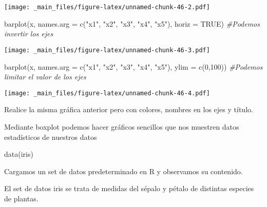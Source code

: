 \documentclass[
]{book}
\newenvironment{Shaded}{\begin{snugshade}}{\end{snugshade}}
\newcommand{\AttributeTok}[1]{\textcolor[rgb]{0.77,0.63,0.00}{#1}}
\newcommand{\CommentTok}[1]{\textcolor[rgb]{0.56,0.35,0.01}{\textit{#1}}}
\newcommand{\ConstantTok}[1]{\textcolor[rgb]{0.00,0.00,0.00}{#1}}
\newcommand{\DecValTok}[1]{\textcolor[rgb]{0.00,0.00,0.81}{#1}}
\newcommand{\FunctionTok}[1]{\textcolor[rgb]{0.00,0.00,0.00}{#1}}
\newcommand{\NormalTok}[1]{#1}
\newcommand{\SpecialCharTok}[1]{\textcolor[rgb]{0.00,0.00,0.00}{#1}}
\newcommand{\StringTok}[1]{\textcolor[rgb]{0.31,0.60,0.02}{#1}}
\begin{document}
\texttt{[image: \_main\_files/figure-latex/unnamed-chunk-46-2.pdf]}

\begin{Shaded}
\begin{Highlighting}[]
\FunctionTok{barplot}\NormalTok{(x, }\AttributeTok{names.arg =} \FunctionTok{c}\NormalTok{(}\StringTok{"x1"}\NormalTok{, }\StringTok{"x2"}\NormalTok{, }\StringTok{"x3"}\NormalTok{, }\StringTok{"x4"}\NormalTok{, }\StringTok{"x5"}\NormalTok{), }\AttributeTok{horiz =} \ConstantTok{TRUE}\NormalTok{) }\CommentTok{\#Podemos invertir los ejes}
\end{Highlighting}
\end{Shaded}

\texttt{[image: \_main\_files/figure-latex/unnamed-chunk-46-3.pdf]}

\begin{Shaded}
\begin{Highlighting}[]
\FunctionTok{barplot}\NormalTok{(x, }\AttributeTok{names.arg =} \FunctionTok{c}\NormalTok{(}\StringTok{"x1"}\NormalTok{, }\StringTok{"x2"}\NormalTok{, }\StringTok{"x3"}\NormalTok{, }\StringTok{"x4"}\NormalTok{, }\StringTok{"x5"}\NormalTok{), }\AttributeTok{ylim =} \FunctionTok{c}\NormalTok{(}\DecValTok{0}\NormalTok{,}\DecValTok{100}\NormalTok{)) }\CommentTok{\#Podemos limitar el valor de los ejes}
\end{Highlighting}
\end{Shaded}

\texttt{[image: \_main\_files/figure-latex/unnamed-chunk-46-4.pdf]}

Realice la misma gráfica anterior pero con colores, nombres en los ejes y título.

Mediante boxplot podemos hacer gráficos sencillos que nos muestren datos estadísticos de nuestros datos

\begin{Shaded}
\begin{Highlighting}[]
\FunctionTok{data}\NormalTok{(iris)}
\end{Highlighting}
\end{Shaded}

Cargamos un set de datos predeterminado en R y observamos su contenido.

El set de datos iris se trata de medidas del sépalo y pétalo de distintas especies de plantas.

\begin{Shaded}
\end{Shaded}
\end{document}
